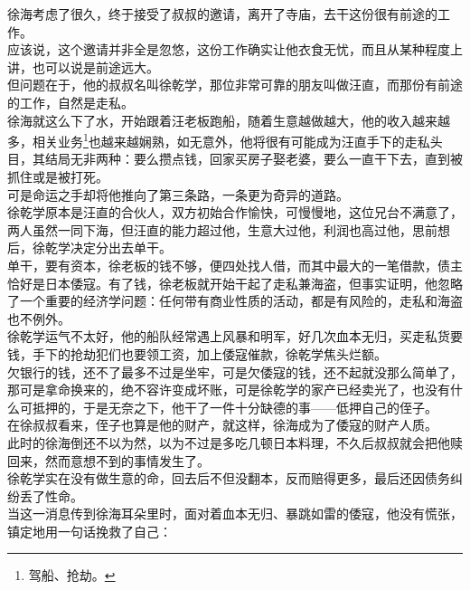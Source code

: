 \begin{multicols}{\theparacolNo}
徐海考虑了很久，终于接受了叔叔的邀请，离开了寺庙，去干这份很有前途的工作。\\

应该说，这个邀请并非全是忽悠，这份工作确实让他衣食无忧，而且从某种程度上讲，也可以说是前途远大。\\

但问题在于，他的叔叔名叫徐乾学，那位非常可靠的朋友叫做汪直，而那份有前途的工作，自然是走私。\\

徐海就这么下了水，开始跟着汪老板跑船，随着生意越做越大，他的收入越来越多，相关业务\footnote{驾船、抢劫。}也越来越娴熟，如无意外，他将很有可能成为汪直手下的走私头目，其结局无非两种：要么攒点钱，回家买房子娶老婆，要么一直干下去，直到被抓住或是被打死。\\

可是命运之手却将他推向了第三条路，一条更为奇异的道路。\\

徐乾学原本是汪直的合伙人，双方初始合作愉快，可慢慢地，这位兄台不满意了，两人虽然一同下海，但汪直的能力超过他，生意大过他，利润也高过他，思前想后，徐乾学决定分出去单干。\\

单干，要有资本，徐老板的钱不够，便四处找人借，而其中最大的一笔借款，债主恰好是日本倭寇。有了钱，徐老板就开始干起了走私兼海盗，但事实证明，他忽略了一个重要的经济学问题：任何带有商业性质的活动，都是有风险的，走私和海盗也不例外。\\

徐乾学运气不太好，他的船队经常遇上风暴和明军，好几次血本无归，买走私货要钱，手下的抢劫犯们也要领工资，加上倭寇催款，徐乾学焦头烂额。\\

欠银行的钱，还不了最多不过是坐牢，可是欠倭寇的钱，还不起就没那么简单了，那可是拿命换来的，绝不容许变成坏账，可是徐乾学的家产已经卖光了，也没有什么可抵押的，于是无奈之下，他干了一件十分缺德的事——低押自己的侄子。\\

在徐叔叔看来，侄子也算是他的财产，就这样，徐海成为了倭寇的财产人质。\\

此时的徐海倒还不以为然，以为不过是多吃几顿日本料理，不久后叔叔就会把他赎回来，然而意想不到的事情发生了。\\

徐乾学实在没有做生意的命，回去后不但没翻本，反而赔得更多，最后还因债务纠纷丢了性命。\\

当这一消息传到徐海耳朵里时，面对着血本无归、暴跳如雷的倭寇，他没有慌张，镇定地用一句话挽救了自己：\\


\end{multicols}
